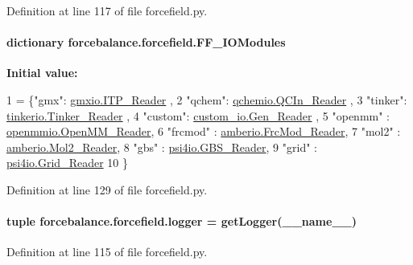 Definition at line 117 of file forcefield.\-py.

\hypertarget{namespaceforcebalance_1_1forcefield_a3beac9806e0438b79b9ae60a47c7b131}{
\paragraph[{F\-F\-\_\-\-I\-O\-Modules}]{\setlength{\rightskip}{0pt plus 5cm}dictionary forcebalance.\-forcefield.\-F\-F\-\_\-\-I\-O\-Modules}}\label{namespaceforcebalance_1_1forcefield_a3beac9806e0438b79b9ae60a47c7b131}
{\bfseries Initial value\-:}
\begin{DoxyCode}
1 = \{\textcolor{stringliteral}{"gmx"}: \hyperlink{classforcebalance_1_1gmxio_1_1ITP__Reader}{gmxio.ITP\_Reader} ,
2                 \textcolor{stringliteral}{"qchem"}: \hyperlink{classforcebalance_1_1qchemio_1_1QCIn__Reader}{qchemio.QCIn\_Reader} ,
3                 \textcolor{stringliteral}{"tinker"}: \hyperlink{classforcebalance_1_1tinkerio_1_1Tinker__Reader}{tinkerio.Tinker\_Reader} ,
4                 \textcolor{stringliteral}{"custom"}: \hyperlink{classforcebalance_1_1custom__io_1_1Gen__Reader}{custom\_io.Gen\_Reader} , 
5                 \textcolor{stringliteral}{"openmm"} : \hyperlink{classforcebalance_1_1openmmio_1_1OpenMM__Reader}{openmmio.OpenMM\_Reader},
6                 \textcolor{stringliteral}{"frcmod"} : \hyperlink{classforcebalance_1_1amberio_1_1FrcMod__Reader}{amberio.FrcMod\_Reader},
7                 \textcolor{stringliteral}{"mol2"} : \hyperlink{classforcebalance_1_1amberio_1_1Mol2__Reader}{amberio.Mol2\_Reader},
8                 \textcolor{stringliteral}{"gbs"} : \hyperlink{classforcebalance_1_1psi4io_1_1GBS__Reader}{psi4io.GBS\_Reader},
9                 \textcolor{stringliteral}{"grid"} : \hyperlink{classforcebalance_1_1psi4io_1_1Grid__Reader}{psi4io.Grid\_Reader}
10                 \}
\end{DoxyCode}


Definition at line 129 of file forcefield.\-py.

\hypertarget{namespaceforcebalance_1_1forcefield_ab770be419e9b4522779dc3dfb1d7d019}{
\paragraph[{logger}]{\setlength{\rightskip}{0pt plus 5cm}tuple forcebalance.\-forcefield.\-logger = get\-Logger(\-\_\-\-\_\-name\-\_\-\-\_\-)}}\label{namespaceforcebalance_1_1forcefield_ab770be419e9b4522779dc3dfb1d7d019}


Definition at line 115 of file forcefield.\-py.

